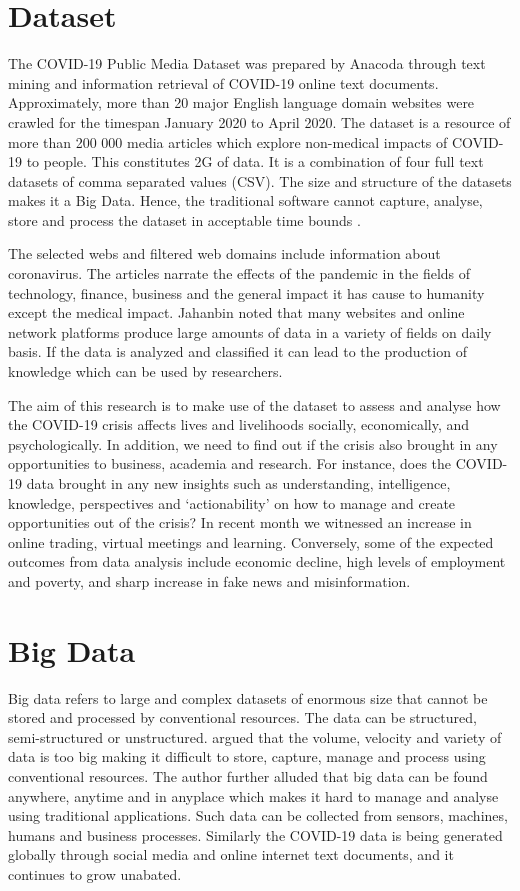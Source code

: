 \documentclass[11pt,twoside,conference]{IEEEtran}
\begin{document}
\section{Dataset}
The COVID-19 Public Media Dataset was prepared by Anacoda through text mining and information retrieval of COVID-19 online text documents. Approximately, more than 20 major English language domain websites were crawled for the timespan January 2020 to April 2020. The dataset is a resource of more than 200 000 media articles which explore non-medical impacts of COVID-19 to people.  This constitutes 2G of data.   It is a combination of four  full text datasets of comma separated values (CSV). The size and structure of the datasets makes it a Big Data. Hence, the traditional software cannot capture, analyse, store and process  the dataset in acceptable time bounds \cite{Patel et al}.

The selected webs and filtered web domains include information  about coronavirus. The articles narrate the effects of the pandemic in the fields of technology, finance, business and the general impact it has cause to humanity except the medical impact. {Jahanbin} noted that many websites and online network platforms produce large amounts of data in a variety of fields on daily basis. If the data is analyzed and classified it can lead to the production of knowledge which can be used by researchers. 

The aim of this research is to make use of the dataset to assess and analyse how the COVID-19 crisis affects lives and livelihoods socially, economically, and psychologically. In addition, we need to find out if the crisis also brought in any opportunities to business, academia and research.  For instance, does the COVID-19 data brought in any new insights such as understanding, intelligence, knowledge, perspectives and ‘actionability’ on how to manage and create opportunities out of the crisis? In recent month we witnessed an increase in online trading, virtual meetings and learning.  Conversely, some of the expected outcomes from data analysis include economic decline, high levels of employment and poverty, and sharp increase in fake news and misinformation.

\section{Big Data}
Big data refers to large and complex datasets of enormous size that cannot be stored and processed by conventional resources\cite{Grolinger}. The data can be structured, semi-structured or unstructured. \cite{Owais} argued that the volume, velocity and variety of data is too big making it difficult to store, capture, manage and process using conventional resources. The author further alluded that big data can be found anywhere, anytime and in anyplace which makes it hard to manage and analyse using traditional applications\cite{Owais}. Such data can be collected from sensors, machines, humans and business processes. Similarly the COVID-19 data is being generated globally through social media and online internet text documents, and  it continues to grow unabated. 
\end{document}
